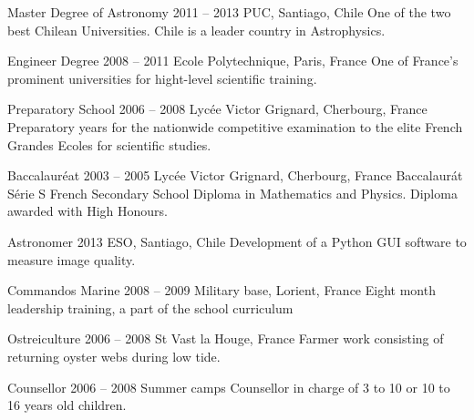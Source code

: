 


\begin{yearlist}
\item[Master Degree of Astronomy]{2011 -- 2013}
	{PUC, Santiago, Chile}
    {One of the two best Chilean Universities. 
    Chile is a leader country in Astrophysics.}

\item[Engineer Degree]{2008 -- 2011}
	{Ecole Polytechnique, Paris, France}
    {One of France's prominent universities for hight-­level scientific training.}


\item[Preparatory School]{2006 -- 2008}
	{Lyc\'ee Victor Grignard, Cherbourg, France}
	{Preparatory years for the nationwide competitive examination to the elite French Grandes Ecoles for scientific studies.  }


\item[Baccalaur\'eat]{2003 -- 2005}
	{Lyc\'ee Victor Grignard, Cherbourg, France}
	{Baccalaur\'at S\'erie S French Secondary School Diploma in Mathematics and Physics. 
    Diploma awarded with High Honours.}

\end{yearlist}


\begin{joblist}

\item[Astronomer]{2013}
	{ESO, Santiago, Chile}
	{Development of a Python GUI software to measure image quality.}


\item[Commandos Marine]{2008 -- 2009}
	{Military base, Lorient, France}
	{Eight ­month leadership training, a part of the school curriculum}

\item[Ostreiculture]{2006 -- 2008}
	{St Vast la Houge, France}
	{Farmer work consisting of returning oyster webs during low tide.}


\item[Counsellor]{2006 -- 2008}
	{Summer camps}
	{Counsellor in charge of 3 to 10 or 10 to 16 years old children.}
\end{joblist}






